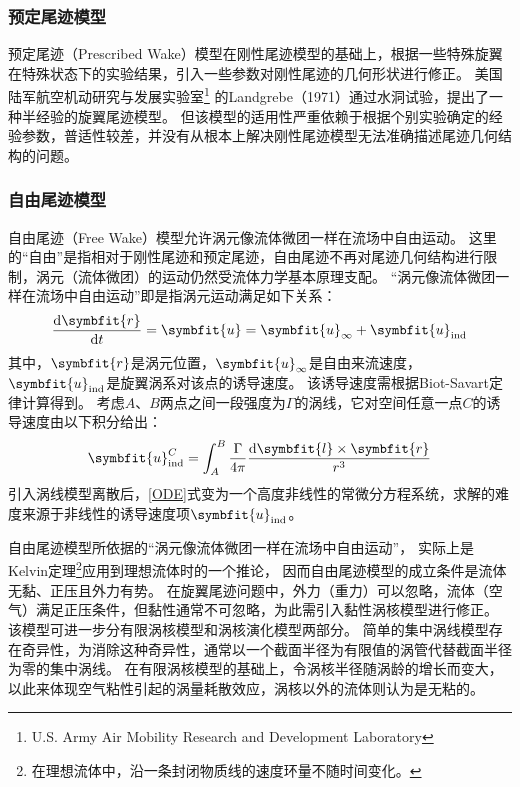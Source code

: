 \documentclass[doctor,openright,twoside,color]{buaathesis}
\begin{document}
\subsubsection{预定尾迹模型}
预定尾迹（Prescribed Wake）模型在刚性尾迹模型的基础上，根据一些特殊旋翼在特殊状态下的实验结果，引入一些参数对刚性尾迹的几何形状进行修正。
美国陆军航空机动研究与发展实验室\footnote{U.S. Army Air Mobility Research and Development Laboratory}
的Landgrebe（1971）通过水洞试验，提出了一种半经验的旋翼尾迹模型。
但该模型的适用性严重依赖于根据个别实验确定的经验参数，普适性较差，并没有从根本上解决刚性尾迹模型无法准确描述尾迹几何结构的问题。

\subsubsection{自由尾迹模型}
自由尾迹（Free Wake）模型允许涡元像流体微团一样在流场中自由运动。
这里的“自由”是指相对于刚性尾迹和预定尾迹，自由尾迹不再对尾迹几何结构进行限制，涡元（流体微团）的运动仍然受流体力学基本原理支配。
“涡元像流体微团一样在流场中自由运动”即是指涡元运动满足如下关系：
\begin{equation}\label{ODE}
\frac{\mathrm{d}\symbfit{r}}{\mathrm{d} t} = \symbfit{u} = \symbfit{u}_{\mathrm{\infty}}+\symbfit{u}_{\mathrm{ind}}
\end{equation}
其中，$\symbfit{r}$是涡元位置，$\symbfit{u}_{\mathrm{\infty}}$是自由来流速度，$\symbfit{u}_{\mathrm{ind}}$是旋翼涡系对该点的诱导速度。
该诱导速度需根据Biot-Savart定律计算得到。
考虑$A$、$B$两点之间一段强度为$\Gamma$的涡线，它对空间任意一点$C$的诱导速度由以下积分给出：
\begin{equation}
\symbfit{u}_{\mathrm{ind}}^{C}
=
\int_{A}^{B}
\frac{\Gamma}{4\pi}
\frac{\mathrm{d} \symbfit{l}\times\symbfit{r}}{r^3}
\end{equation}
引入涡线模型离散后，\ref{ODE}式变为一个高度非线性的常微分方程系统，求解的难度来源于非线性的诱导速度项$\symbfit{u}_{\mathrm{ind}}$。

自由尾迹模型所依据的“涡元像流体微团一样在流场中自由运动”，
实际上是Kelvin定理\footnote{在理想流体中，沿一条封闭物质线的速度环量不随时间变化。}应用到理想流体时的一个推论，
因而自由尾迹模型的成立条件是流体无黏、正压且外力有势。
在旋翼尾迹问题中，外力（重力）可以忽略，流体（空气）满足正压条件，但黏性通常不可忽略，为此需引入黏性涡核模型进行修正。
该模型可进一步分有限涡核模型和涡核演化模型两部分。
简单的集中涡线模型存在奇异性，为消除这种奇异性，通常以一个截面半径为有限值的涡管代替截面半径为零的集中涡线。
在有限涡核模型的基础上，令涡核半径随涡龄的增长而变大，以此来体现空气粘性引起的涡量耗散效应，涡核以外的流体则认为是无粘的。
\end{document}
